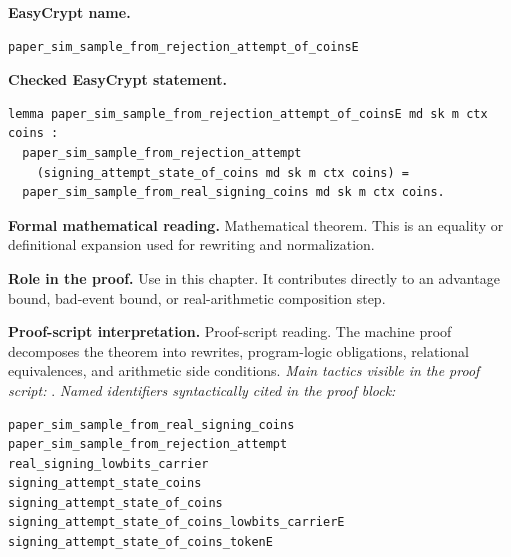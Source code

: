 \begin{formaltheorem}
\noindent\textbf{EasyCrypt name.}
\begin{lstlisting}[language=EasyCrypt,basicstyle=\ttfamily\scriptsize]
paper_sim_sample_from_rejection_attempt_of_coinsE
\end{lstlisting}
\noindent\textbf{Checked EasyCrypt statement.}
\begin{lstlisting}[language=EasyCrypt,basicstyle=\ttfamily\scriptsize]
lemma paper_sim_sample_from_rejection_attempt_of_coinsE md sk m ctx coins :
  paper_sim_sample_from_rejection_attempt
    (signing_attempt_state_of_coins md sk m ctx coins) =
  paper_sim_sample_from_real_signing_coins md sk m ctx coins.
\end{lstlisting}
\noindent\textbf{Formal mathematical reading.}
Mathematical theorem. This is an equality or definitional expansion used for rewriting and normalization.

\noindent\textbf{Role in the proof.}
Use in this chapter. It contributes directly to an advantage bound, bad-event bound, or real-arithmetic composition step.

\noindent\textbf{Proof-script interpretation.}
Proof-script reading. The machine proof decomposes the theorem into rewrites, program-logic obligations, relational equivalences, and arithmetic side conditions.
\emph{Main tactics visible in the proof script:} .
\emph{Named identifiers syntactically cited in the proof block:}
\begin{lstlisting}[language=EasyCrypt,basicstyle=\ttfamily\scriptsize]
paper_sim_sample_from_real_signing_coins
paper_sim_sample_from_rejection_attempt
real_signing_lowbits_carrier
signing_attempt_state_coins
signing_attempt_state_of_coins
signing_attempt_state_of_coins_lowbits_carrierE
signing_attempt_state_of_coins_tokenE
\end{lstlisting}

\end{formaltheorem}

